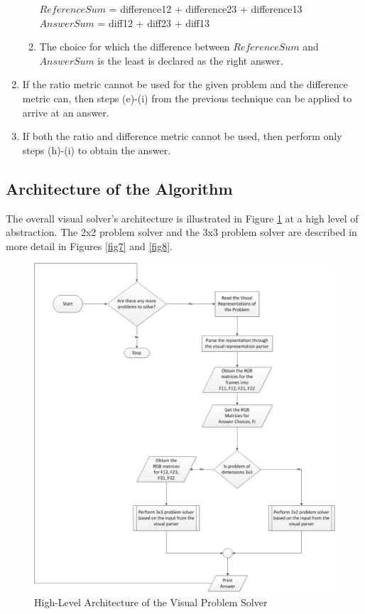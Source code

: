 \documentclass[10pt, letter]{article}
\begin{document}
\begin{enumerate}
\begin{enumerate}
		\hspace*{3cm} $ReferenceSum$ = difference12 + difference23 + difference13 \\
		\hspace*{3cm} $AnswerSum$ = diff12 + diff23 + diff13 
		\item The choice for which the difference between $ReferenceSum$ and $AnswerSum$ is the least is declared as the right answer.
	\end{enumerate}
\item If the ratio metric cannot be used for the given problem and the difference metric can, then steps (e)-(i) from the previous technique can be applied to arrive at an answer.
\item If both the ratio and difference metric cannot be used, then perform only steps (h)-(i) to obtain the answer.
\end{enumerate}

\subsection*{Architecture of the Algorithm}
The overall visual solver's architecture is illustrated in Figure \ref{fig6} at a high level of abstraction. The 2x2 problem solver and the 3x3 problem solver are described in more detail in Figures \ref{fig7} and \ref{fig8}.

\begin{figure}[h!]
  \centering
    \includegraphics[scale = 0.35]{Images/Fig6}
    \caption{High-Level Architecture of the Visual Problem Solver}
  \label{fig6}
\end{figure}
\end{document}
